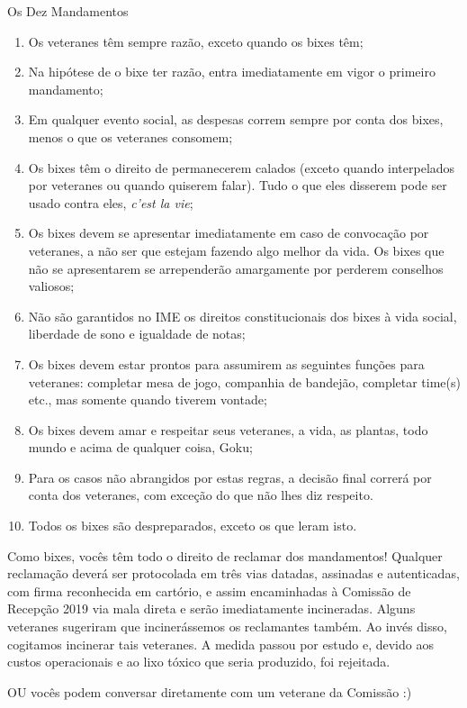 \begin{editorial}{Os Dez Mandamentos}

\begin{enumerate}
  \item Os veteranes têm sempre razão, exceto quando os bixes têm;
  \item Na hipótese de o bixe ter razão, entra imediatamente em vigor
        o primeiro mandamento;
  \item Em qualquer evento social, as despesas correm sempre por conta dos
        bixes, menos o que os veteranes consomem;
  \item Os bixes têm o direito de permanecerem calados (exceto quando
        interpelados por veteranes ou quando quiserem falar). Tudo o que eles
        disserem pode ser usado contra eles, \textit{c’est la vie};
  \item Os bixes devem se apresentar imediatamente em caso de convocação por
        veteranes, a não ser que estejam fazendo algo melhor da vida. Os bixes
        que não se apresentarem se arrependerão amargamente por perderem
        conselhos valiosos; %
  \item Não são garantidos no IME os direitos constitucionais dos bixes à vida
        social, liberdade de sono e igualdade de notas;
  \item Os bixes devem estar prontos para assumirem as seguintes funções para
        veteranes: completar mesa de jogo, companhia de bandejão, completar
        time(s) etc., mas somente quando tiverem vontade;
  \item Os bixes devem amar e respeitar seus veteranes, a vida, as plantas,
        todo mundo e acima de qualquer coisa, Goku;
  \item Para os casos não abrangidos por estas regras, a decisão final correrá
        por conta dos veteranes, com exceção do que não lhes diz respeito.
  \item Todos os bixes são despreparados, exceto os que leram isto.
\end{enumerate}

Como bixes, vocês têm todo o direito de reclamar dos mandamentos! Qualquer
reclamação deverá ser protocolada em três vias datadas, assinadas e
autenticadas, com firma reconhecida em cartório, e assim encaminhadas à
Comissão de Recepção 2019 %
via mala direta e serão imediatamente incineradas. Alguns veteranes sugeriram
que incinerássemos os reclamantes também. Ao invés disso, cogitamos incinerar
tais veteranes. A medida passou por estudo e, devido aos custos operacionais e
ao lixo tóxico que seria produzido, foi rejeitada.

OU vocês podem conversar diretamente com um veterane da Comissão :)

\end{editorial}
